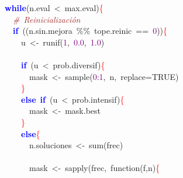 \mbox{}\ \ \textbf{\textcolor{Blue}{while}}\textcolor{BrickRed}{(}n\textcolor{BrickRed}{.}eval\ \textcolor{BrickRed}{\textless{}}\ max\textcolor{BrickRed}{.}eval\textcolor{BrickRed}{)}\textcolor{Red}{\{} \\
\mbox{}\ \ \ \ \textit{\textcolor{Brown}{\#\ Reinicialización}} \\
\mbox{}\ \ \ \ \textbf{\textcolor{Blue}{if}}\ \textcolor{BrickRed}{((}n\textcolor{BrickRed}{.}sin\textcolor{BrickRed}{.}mejora\ \textcolor{BrickRed}{\%\%}\ tope\textcolor{BrickRed}{.}reinic\ \textcolor{BrickRed}{==}\ \textcolor{Purple}{0}\textcolor{BrickRed}{))}\textcolor{Red}{\{} \\
\mbox{}\ \ \ \ \ \ u\ \textcolor{BrickRed}{\textless{}-}\ runif\textcolor{BrickRed}{(}\textcolor{Purple}{1}\textcolor{BrickRed}{,}\ \textcolor{Purple}{0.0}\textcolor{BrickRed}{,}\ \textcolor{Purple}{1.0}\textcolor{BrickRed}{)} \\
\mbox{}\ \ \ \ \ \  \\
\mbox{}\ \ \ \ \ \ \textbf{\textcolor{Blue}{if}}\ \textcolor{BrickRed}{(}u\ \textcolor{BrickRed}{\textless{}}\ prob\textcolor{BrickRed}{.}diversif\textcolor{BrickRed}{)}\textcolor{Red}{\{} \\
\mbox{}\ \ \ \ \ \ \ \ mask\ \textcolor{BrickRed}{\textless{}-}\ sample\textcolor{BrickRed}{(}\textcolor{Purple}{0}\textcolor{BrickRed}{:}\textcolor{Purple}{1}\textcolor{BrickRed}{,}\ n\textcolor{BrickRed}{,}\ replace\textcolor{BrickRed}{=}TRUE\textcolor{BrickRed}{)} \\
\mbox{}\ \ \ \ \ \ \textcolor{Red}{\}} \\
\mbox{}\ \ \ \ \ \ \textbf{\textcolor{Blue}{else}}\ \textbf{\textcolor{Blue}{if}}\ \textcolor{BrickRed}{(}u\ \textcolor{BrickRed}{\textless{}}\ prob\textcolor{BrickRed}{.}intensif\textcolor{BrickRed}{)}\textcolor{Red}{\{} \\
\mbox{}\ \ \ \ \ \ \ \ mask\ \textcolor{BrickRed}{\textless{}-}\ mask\textcolor{BrickRed}{.}best \\
\mbox{}\ \ \ \ \ \ \textcolor{Red}{\}} \\
\mbox{}\ \ \ \ \ \ \textbf{\textcolor{Blue}{else}}\textcolor{Red}{\{} \\
\mbox{}\ \ \ \ \ \ \ \ n\textcolor{BrickRed}{.}soluciones\ \textcolor{BrickRed}{\textless{}-}\ sum\textcolor{BrickRed}{(}frec\textcolor{BrickRed}{)} \\
\mbox{}\ \ \ \ \ \ \ \  \\
\mbox{}\ \ \ \ \ \ \ \ mask\ \textcolor{BrickRed}{\textless{}-}\ sapply\textcolor{BrickRed}{(}frec\textcolor{BrickRed}{,}\ function\textcolor{BrickRed}{(}f\textcolor{BrickRed}{,}n\textcolor{BrickRed}{)}\textcolor{Red}{\{} \\
